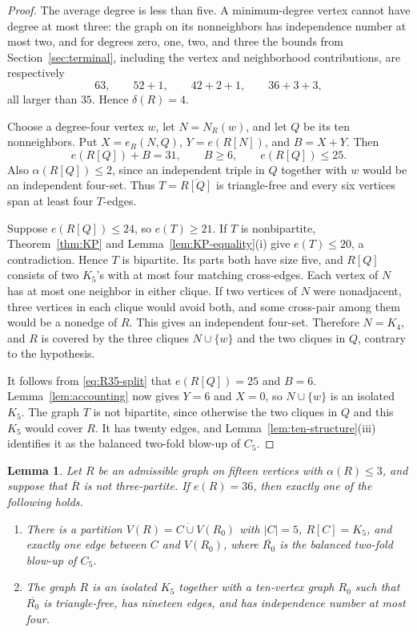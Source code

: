 \documentclass[11pt,reqno,a4paper]{amsart}
\newtheorem{lemma}[theorem]{Lemma}
\theoremstyle{definition}
\theoremstyle{remark}
\newcommand{\comp}[1]{\overline{#1}}
\begin{document}
\begin{proof}
The average degree is less than five.  A minimum-degree vertex cannot have
degree at most three: the graph on its nonneighbors has independence number
at most two, and for degrees zero, one, two, and three the bounds from
Section~\ref{sec:terminal}, including the vertex and neighborhood
contributions, are respectively
\[
  63,\qquad 52+1,\qquad 42+2+1,\qquad 36+3+3,
\]
all larger than $35$.  Hence $\delta(R)=4$.

Choose a degree-four vertex $w$, let $N=N_R(w)$, and let $Q$ be its ten
nonneighbors.  Put $X=e_R(N,Q)$, $Y=e(R[N])$, and $B=X+Y$.  Then
\begin{equation}\label{eq:R35-split}
  e(R[Q])+B=31,\qquad B\geq6,\qquad e(R[Q])\leq25.
\end{equation}
Also $\alpha(R[Q])\leq2$, since an independent triple in $Q$ together with
$w$ would be an independent four-set.  Thus $T=\comp{R[Q]}$ is
triangle-free and every six vertices span at least four $T$-edges.

Suppose $e(R[Q])\leq24$, so $e(T)\geq21$.  If $T$ is nonbipartite,
Theorem~\ref{thm:KP} and Lemma~\ref{lem:KP-equality}(i) give $e(T)\leq20$,
a contradiction.  Hence $T$ is bipartite.  Its parts both have size five,
and $R[Q]$ consists of two $K_5$'s with at most four matching cross-edges.
Each vertex of $N$ has at most one neighbor in either clique.  If two
vertices of $N$ were nonadjacent, three vertices in each clique would avoid
both, and some cross-pair among them would be a nonedge of $R$.  This gives
an independent four-set.  Therefore $N=K_4$, and $R$ is covered by the
three cliques $N\cup\{w\}$ and the two cliques in $Q$, contrary to the
hypothesis.

It follows from \eqref{eq:R35-split} that $e(R[Q])=25$ and $B=6$.
Lemma~\ref{lem:accounting} now gives $Y=6$ and $X=0$, so $N\cup\{w\}$ is
an isolated $K_5$.  The graph $T$ is not bipartite, since otherwise the two
cliques in $Q$ and this $K_5$ would cover $R$.  It has twenty edges, and
Lemma~\ref{lem:ten-structure}(iii) identifies it as the balanced two-fold
blow-up of $C_5$.
\end{proof}

\begin{lemma}\label{lem:fifteen-36}
Let $R$ be an admissible graph on fifteen vertices with $\alpha(R)\leq3$,
and suppose that $\comp R$ is not three-partite.  If $e(R)=36$, then exactly
one of the following holds.
\begin{enumerate}[label=\textup{(\roman*)}]
\item There is a partition $V(R)=C\mathbin{\dot\cup}V(R_0)$ with
$|C|=5$, $R[C]=K_5$, and exactly one edge between $C$ and $V(R_0)$, where
$\comp{R_0}$ is the balanced two-fold blow-up of $C_5$.
\item The graph $R$ is an isolated $K_5$ together with a ten-vertex graph
$R_0$ such that $\comp{R_0}$ is triangle-free, has nineteen edges, and has
independence number at most four.
\end{enumerate}
\end{lemma}
\end{document}
